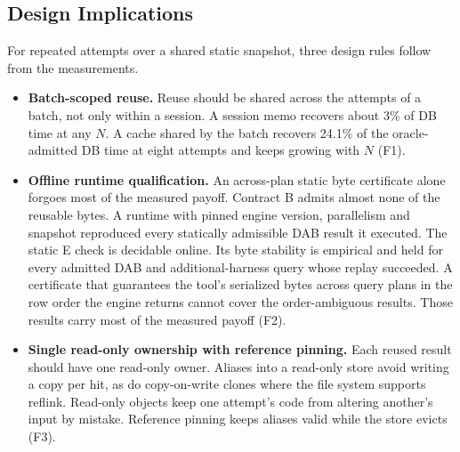 \subsection{Design Implications}
\label{sec:implications}

For repeated attempts over a shared static snapshot, three design rules follow from the measurements.
\begin{itemize}
  \item \textbf{Batch-scoped reuse.} Reuse should be shared across the attempts of a batch, not only within a
  session. A session memo recovers about 3\% of DB time at any $N$. A cache shared by the batch recovers 24.1\% of
  the oracle-admitted DB time at eight attempts and keeps growing with $N$ (F1).
  \item \textbf{Offline runtime qualification.} An across-plan static byte certificate alone forgoes most of the
  measured payoff. Contract B admits almost none of the reusable bytes. A runtime with pinned engine version,
  parallelism and snapshot reproduced every statically admissible DAB result it executed. The static E check is
  decidable online. Its byte stability is empirical and held for every admitted DAB and additional-harness query
  whose replay succeeded. A certificate that guarantees the tool's serialized bytes across query plans in the row
  order the engine returns cannot cover the order-ambiguous results. Those results carry most of the measured
  payoff (F2).
  \item \textbf{Single read-only ownership with reference pinning.} Each reused result should have one read-only
  owner. Aliases into a read-only store avoid writing a copy per hit, as do copy-on-write clones where the file
  system supports reflink. Read-only objects keep one attempt's code from altering another's input by mistake.
  Reference pinning keeps aliases valid while the store evicts (F3).
\end{itemize}
